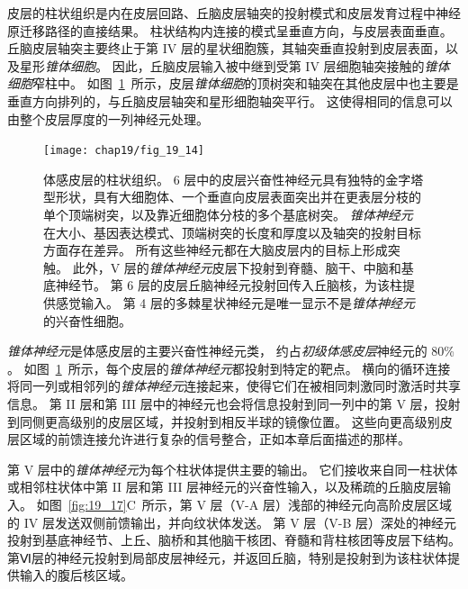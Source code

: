 皮层的柱状组织是内在皮层回路、丘脑皮层轴突的投射模式和皮层发育过程中神经原迁移路径的直接结果。
柱状结构内连接的模式呈垂直方向，与皮层表面垂直。
丘脑皮层轴突主要终止于第 IV 层的星状细胞簇，其轴突垂直投射到皮层表面，以及星形\textit{锥体细胞}。
因此，丘脑皮层输入被中继到受第 IV 层细胞轴突接触的\textit{锥体细胞}窄柱中。
如图~\ref{fig:19_14}~所示，皮层\textit{锥体细胞}的顶树突和轴突在其他皮层中也主要是垂直方向排列的，与丘脑皮层轴突和星形细胞轴突平行。
这使得相同的信息可以由整个皮层厚度的一列神经元处理。


\begin{figure}[htbp]
	\centering
	\texttt{[image: chap19/fig\_19\_14]}
	\caption{体感皮层的柱状组织。
		6 层中的皮层兴奋性神经元具有独特的金字塔型形状，具有大细胞体、一个垂直向皮层表面突出并在更表层分枝的单个顶端树突，以及靠近细胞体分枝的多个基底树突。
		\textit{锥体神经元}在大小、基因表达模式、顶端树突的长度和厚度以及轴突的投射目标方面存在差异。
		所有这些神经元都在大脑皮层内的目标上形成突触。
		此外，V 层的\textit{锥体神经元}皮层下投射到脊髓、脑干、中脑和基底神经节。
		第 6 层的皮层丘脑神经元投射回传入丘脑核，为该柱提供感觉输入。
		第 4 层的多棘星状神经元是唯一显示不是\textit{锥体神经元}的兴奋性细胞\cite{oberlaender2012cell}。}
	\label{fig:19_14}
\end{figure}


\textit{锥体神经元}是体感皮层的主要兴奋性神经元类，
约占\textit{初级体感皮层}神经元的 80\% 。 
如图~\ref{fig:19_14}~所示，每个皮层的\textit{锥体神经元}都投射到特定的靶点。
横向的循环连接将同一列或相邻列的\textit{锥体神经元}连接起来，使得它们在被相同刺激同时激活时共享信息。
第 II 层和第 III 层中的神经元也会将信息投射到同一列中的第 V 层，投射到同侧更高级别的皮层区域，并投射到相反半球的镜像位置。
这些向更高级别皮层区域的前馈连接允许进行复杂的信号整合，正如本章后面描述的那样。


第 V 层中的\textit{锥体神经元}为每个柱状体提供主要的输出。
它们接收来自同一柱状体或相邻柱状体中第 II 层和第 III 层神经元的兴奋性输入，以及稀疏的丘脑皮层输入。
如图~\ref{fig:19_17}C~所示，第 V 层（V-A 层）浅部的神经元向高阶皮层区域的 IV 层发送双侧前馈输出，并向纹状体发送。
第 V 层（V-B 层）深处的神经元投射到基底神经节、上丘、脑桥和其他脑干核团、脊髓和背柱核团等皮层下结构。
第Ⅵ层的神经元投射到局部皮层神经元，并返回丘脑，特别是投射到为该柱状体提供输入的腹后核区域。


